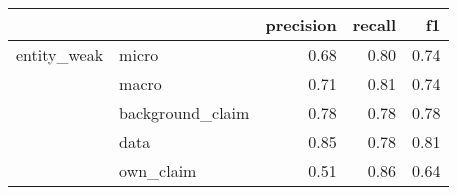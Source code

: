 \begin{tabular}{llrrr}
\toprule
            &           &  precision &  recall &   f1 \\
\midrule
entity\_weak & micro &       0.68 &    0.80 & 0.74 \\
            & macro &       0.71 &    0.81 & 0.74 \\
            & background\_claim &       0.78 &    0.78 & 0.78 \\
            & data &       0.85 &    0.78 & 0.81 \\
            & own\_claim &       0.51 &    0.86 & 0.64 \\
\bottomrule
\end{tabular}
